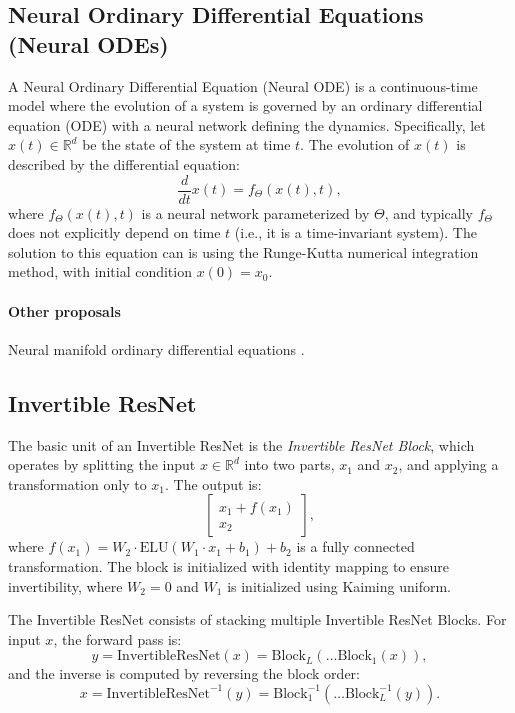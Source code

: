 \documentclass{article}
\theoremstyle{definition} \newtheorem{definition}{Definition}  \newtheorem{example}{Example}
\theoremstyle{remark} \newtheorem{remark}{Remark}
\newcounter{ct}
\begin{document}
\subsection{Neural Ordinary Differential Equations (Neural ODEs)}
\citep{chen2018neural,massaroli2020dissecting}
A Neural Ordinary Differential Equation (Neural ODE) is a continuous-time model where the evolution of a system is governed by an ordinary differential equation (ODE) with a neural network defining the dynamics. Specifically, let \( x(t) \in \mathbb{R}^d \) be the state of the system at time \( t \). The evolution of \( x(t) \) is described by the differential equation:
\begin{equation}
    \frac{d}{dt} x(t) = f_\Theta(x(t), t),
\end{equation}
where \( f_\Theta(x(t), t) \) is a neural network parameterized by \( \Theta \), and typically \( f_\Theta \) does not explicitly depend on time \( t \) (i.e., it is a time-invariant system).
 The solution to this equation can is using the Runge-Kutta numerical integration method, with initial condition \( x(0) = x_0 \).

\paragraph{Other proposals}
Neural manifold ordinary differential equations \citep{lou2020neural}.

\subsection{Invertible ResNet}
The basic unit of an Invertible ResNet is the \textit{Invertible ResNet Block}, which operates by splitting the input \( x \in \mathbb{R}^d \) into two parts, \( x_1 \) and \( x_2 \), and applying a transformation only to \( x_1 \). The output is:
\[
 \begin{bmatrix} x_1 + f(x_1) \\ x_2 \end{bmatrix},
\]
where \( f(x_1) = W_2 \cdot \text{ELU}(W_1 \cdot x_1 + b_1) + b_2 \) is a fully connected transformation. %
The block is initialized with identity mapping to ensure invertibility, where \( W_2 = 0 \) and \( W_1 \) is initialized using Kaiming uniform.

The Invertible ResNet consists of stacking multiple Invertible ResNet Blocks. For input \( x \), the forward pass is:
\[
y = \text{InvertibleResNet}(x) = \text{Block}_L(\dots \text{Block}_1(x)),
\]
and the inverse is computed by reversing the block order:
\[
x = \text{InvertibleResNet}^{-1}(y) = \text{Block}_1^{-1}(\dots \text{Block}_L^{-1}(y)).
\]
\end{document}
